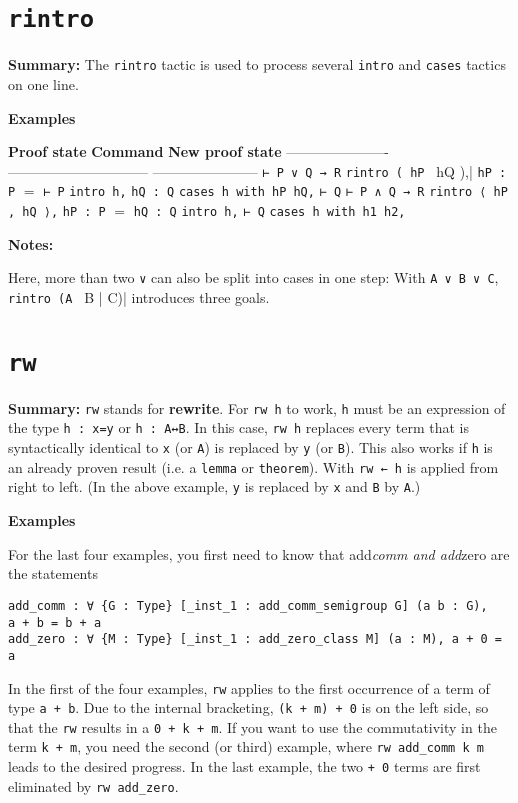 \documentclass{memoir}
\begin{document}
\section{\Verb|rintro|}

\textbf{Summary:} The \Verb|rintro| tactic is used to process several \Verb|intro| and \Verb|cases| tactics on one line.

\textbf{Examples}

\textbf{Proof state} \textbf{Command} \textbf{New proof state}
---------------------- ------------------------------ -----------------------
\Verb|⊢ P ∨ Q → R| \Verb|rintro ( hP | hQ ),| \Verb|hP : P|
$=$ \Verb|⊢ P|
\Verb|intro h,| \Verb|hQ : Q|
\Verb|cases h with hP hQ,| \Verb|⊢ Q|
\Verb|⊢ P ∧ Q → R| \Verb|rintro ⟨ hP , hQ ⟩,| \Verb|hP : P|
$=$ \Verb|hQ : Q|
\Verb|intro h,| \Verb|⊢ Q|
\Verb|cases h with h1 h2,|

\textbf{Notes:}

Here, more than two \Verb|∨| can also be split into cases in one step: With \Verb|A ∨ B ∨ C|, \Verb|rintro (A | B | C)| introduces three goals.




\section{\Verb|rw|}

\textbf{Summary:} \Verb|rw| stands for \textbf{rewrite}. For \Verb|rw h| to work, \Verb|h| must be an expression of the type \Verb|h : x=y| or \Verb|h : A↔B|. In this case, \Verb|rw h|  replaces every term that is syntactically identical to \Verb|x| (or \Verb|A|) is replaced by \Verb|y| (or \Verb|B|). This also works if \Verb|h| is an already proven result (i.e. a \Verb|lemma| or \Verb|theorem|). With \Verb|rw ← h| is applied from right to left. (In the above example, \Verb|y| is replaced by \Verb|x| and \Verb|B| by \Verb|A|.)

\textbf{Examples}

For the last four examples, you first need to know that add\emph{comm and add}zero are the statements

\begin{verbatim}
add_comm : ∀ {G : Type} [_inst_1 : add_comm_semigroup G] (a b : G),
a + b = b + a
add_zero : ∀ {M : Type} [_inst_1 : add_zero_class M] (a : M), a + 0 = a

\end{verbatim}


In the first of the four examples, \Verb|rw| applies to the first occurrence of a term of type \Verb|a + b|. Due to the internal bracketing, \Verb|(k + m) + 0| is on the left side, so that the \Verb|rw| results in a \Verb|0 + k + m|. If you want to use the commutativity in the term \Verb|k + m|, you need the second (or third) example, where \Verb|rw add_comm k m| leads to the desired progress. In the last example, the two \Verb|+ 0| terms are first eliminated by \Verb|rw add_zero|.
\end{document}
